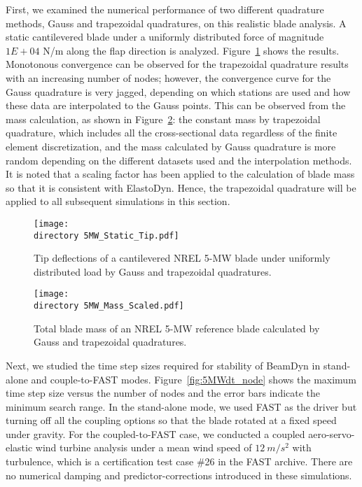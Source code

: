 \documentclass{aiaa-tc}
\def\directory{EPSF/}
\begin{document}
First, we examined the numerical performance of two different quadrature methods, Gauss and trapezoidal quadratures, on this realistic blade analysis. A static cantilevered blade under a uniformly distributed force of magnitude $1E+04$ N/m along the flap direction is analyzed. Figure~\ref{fig:5MWStaticTip} shows the results. Monotonous convergence can be observed for the trapezoidal quadrature results with an increasing number of nodes; however, the convergence curve for the Gauss quadrature is very jagged, depending on which stations are used and how these data are interpolated to the Gauss points. This can be observed from the mass calculation, as shown in Figure~\ref{fig:5MWMass}: the constant mass by trapezoidal quadrature, which includes all the cross-sectional data regardless of the finite element discretization, and the mass calculated by Gauss quadrature is more random depending on the different datasets used and the interpolation methods. It is noted that a scaling factor has been applied to the calculation of blade mass so that it is consistent with ElastoDyn.\cite{report:NREL5MW} Hence, the trapezoidal quadrature will be applied to all subsequent simulations in this section.
\begin{figure}
\centering
\texttt{[image: \\directory 5MW\_Static\_Tip.pdf]}
\caption{Tip deflections of a cantilevered NREL 5-MW blade under uniformly distributed load by Gauss and trapezoidal quadratures.} 
\label{fig:5MWStaticTip}
\end{figure}

\begin{figure}
    \centering
\texttt{[image: \\directory  5MW\_Mass\_Scaled.pdf]}
\caption{Total blade mass of an NREL 5-MW reference blade calculated by Gauss and trapezoidal quadratures.}
\label{fig:5MWMass}
\end{figure} 

Next, we studied the time step sizes required for stability of BeamDyn in stand-alone and couple-to-FAST modes. Figure~\ref{fig:5MWdt_node} shows the maximum time step size versus the number of nodes and the error bars indicate the minimum search range. In the stand-alone mode, we used FAST as the driver but turning off all the coupling options so that the blade rotated at a fixed speed under gravity. For the coupled-to-FAST case, we conducted a coupled aero-servo-elastic wind turbine analysis under a mean wind speed of $12~m/s^2$ with turbulence, which is a certification test case \#26 in the FAST archive. There are no numerical damping and predictor-corrections introduced in these simulations.  
\end{document}

